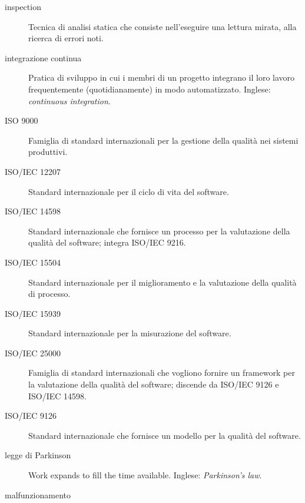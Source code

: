 \documentclass[a4paper]{article}
\begin{document}
\begin{description}
	\item[inspection] 

			Tecnica di analisi statica che consiste nell'eseguire una lettura mirata, alla ricerca di errori noti.
			
	\item[integrazione continua] 

			Pratica di sviluppo in cui i membri di un progetto integrano il loro lavoro frequentemente (quotidianamente) in modo automatizzato. Inglese: \emph{continuous integration}.
			
	\item[ISO 9000] 

			Famiglia di standard internazionali per la gestione della qualità nei sistemi produttivi.
			
	\item[ISO/IEC 12207] 

			Standard internazionale per il ciclo di vita del software.
			
	\item[ISO/IEC 14598] 

			Standard internazionale che fornisce un processo per la valutazione della qualità del software; integra ISO/IEC 9216.
			
	\item[ISO/IEC 15504] 

			Standard internazionale per il miglioramento e la valutazione della qualità di processo.
			
	\item[ISO/IEC 15939] 

			Standard internazionale per la misurazione del software.
			
	\item[ISO/IEC 25000] 

			Famiglia di standard internazionali che vogliono fornire un framework per la valutazione della qualità del software; discende da ISO/IEC 9126 e ISO/IEC 14598.
			
	\item[ISO/IEC 9126] 

			Standard internazionale che fornisce un modello per la qualità del software.
			
	\item[legge di Parkinson] 

			Work expands to fill the time available. Inglese: \emph{Parkinson's law}.
			
	\item[malfunzionamento] 


\end{description}
\end{document}
